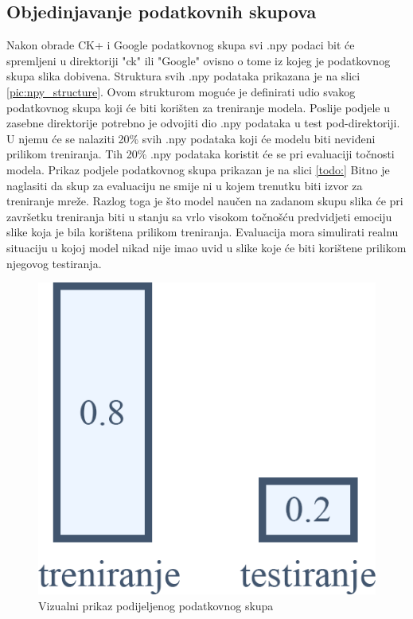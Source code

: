 \documentclass[times, utf8, zavrsni,numeric,pstricks]{fer}
\begin{document}
\subsection{Objedinjavanje podatkovnih skupova}
Nakon obrade CK+ i Google podatkovnog skupa svi .npy podaci bit će spremljeni u direktoriji "ck" ili "Google" ovisno o tome iz kojeg je podatkovnog skupa slika dobivena. Struktura svih .npy podataka prikazana je na slici \ref{pic:npy_structure}. Ovom strukturom moguće je definirati udio svakog podatkovnog skupa koji će biti korišten za treniranje modela. Poslije podjele u zasebne direktorije potrebno je odvojiti dio .npy podataka u test pod-direktoriji. U njemu će se nalaziti 20\% svih .npy podataka koji će modelu biti neviđeni prilikom treniranja. Tih 20\% .npy podataka koristit će se pri evaluaciji točnosti modela. Prikaz podjele podatkovnog skupa prikazan je na slici \ref{todo:} Bitno je naglasiti da skup za evaluaciju ne smije ni u kojem trenutku biti izvor za treniranje mreže. Razlog toga je što model naučen na zadanom skupu slika će pri završetku treniranja biti u stanju sa vrlo visokom točnošću predvidjeti emociju slike koja je bila korištena prilikom treniranja. Evaluacija mora simulirati realnu situaciju u kojoj model nikad nije imao uvid u slike koje će biti korištene prilikom njegovog testiranja.

\begin{figure}[H]
	\centering
	\includegraphics[width=\linewidth, height=0.3\paperheight, keepaspectratio]{splitset.png}
	\caption{Vizualni prikaz podijeljenog podatkovnog skupa}
	\label{pic:dataset_split_percentages}
\end{figure}
\end{document}
